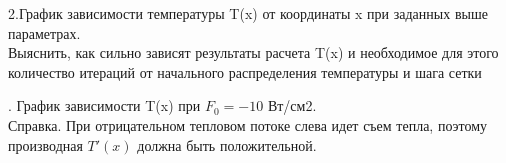 \documentclass[14pt, a4paper]{extarticle}
\begin{document}
\par
2.График зависимости температуры T(x) от координаты x при заданных выше параметрах.\\
Выяснить, как сильно зависят результаты расчета T(x) и необходимое для этого количество итераций от начального распределения температуры и шага сетки
\begin{figure}[h!]	
\end{figure}\par

. График зависимости T(x) при $F_0=-10$ Вт/см2. \\
Справка. При отрицательном тепловом потоке слева идет съем тепла, поэтому производная $T'(x)$ должна быть положительной.
\begin{figure}[h!]	
\end{figure}\par
\end{document}
